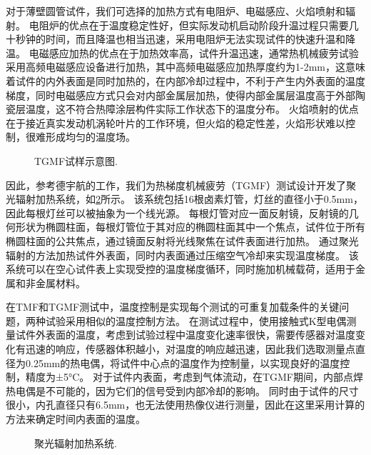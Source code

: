 \documentclass{article}
\begin{document}
对于薄壁圆管试件，我们可选择的加热方式有电阻炉、电磁感应、火焰喷射和辐射。
电阻炉的优点在于温度稳定性好，但实际发动机启动阶段升温过程只需要几十秒钟的时间，而且降温也相当迅速，采用电阻炉无法实现试件的快速升温和降温。
电磁感应加热的优点在于加热效率高，试件升温迅速，通常热机械疲劳试验采用高频电磁感应设备进行加热，其中高频电磁感应加热厚度约为1-2mm，这意味着试件的内外表面是同时加热的，在内部冷却过程中，不利于产生内外表面的温度梯度，同时电磁感应方式只会对内部金属层加热，使得内部金属层温度高于外部陶瓷层温度，这不符合热障涂层构件实际工作状态下的温度分布\cite{BRENDEL2008234}。
火焰喷射的优点在于接近真实发动机涡轮叶片的工作环境，但火焰的稳定性差，火焰形状难以控制，很难形成均匀的温度场\cite{MAUGET2017225}。

\begin{figure}[!htp]
\caption{TGMF试样示意图.}
\label{Fig:Specimen}
\end{figure}

因此，参考德宇航的工作\cite{BAUFELD2008219}，我们为热梯度机械疲劳（TGMF）测试设计开发了聚光辐射加热系统，如\ref{Fig:Radiation_Furnace2}所示。
该系统包括16根卤素灯管，灯丝的直径小于0.5mm，因此每根灯丝可以被抽象为一个线光源。
每根灯管对应一面反射镜，反射镜的几何形状为椭圆柱面，每根灯管位于其对应的椭圆柱面其中一个焦点，试件位于所有椭圆柱面的公共焦点，通过镜面反射将光线聚焦在试件表面进行加热。
通过聚光辐射的方法加热试件外表面，同时内表面通过压缩空气冷却来实现温度梯度。
该系统可以在空心试件表上实现受控的温度梯度循环，同时施加机械载荷，适用于金属和非金属材料。

在TMF和TGMF测试中，温度控制是实现每个测试的可重复加载条件的关键问题，两种试验采用相似的温度控制方法。
在测试过程中，使用接触式K型电偶测量试件外表面的温度，考虑到试验过程中温度变化速率很快，需要传感器对温度变化有迅速的响应，传感器体积越小，对温度的响应越迅速，因此我们选取测量点直径为0.25mm的热电偶，将试件中心点的温度作为控制量，以实现良好的温度控制，精度为±5°C。
对于试件内表面，考虑到气体流动，在TGMF期间，内部点焊热电偶是不可能的，因为它们的信号受到内部冷却的影响。
同时由于试件的尺寸很小，内孔直径只有6.5mm，也无法使用热像仪进行测量，因此在这里采用计算的方法来确定时间内表面的温度。
\begin{figure}[!htp]
\caption{聚光辐射加热系统.}
\label{Fig:Radiation_Furnace2}
\end{figure}
\end{document}
